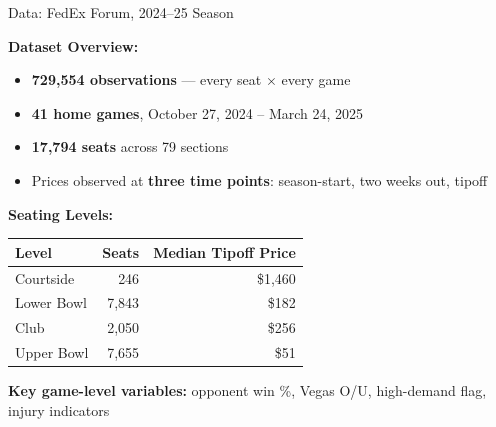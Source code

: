 \documentclass{beamer}
\begin{document}
\begin{frame}{Data: FedEx Forum, 2024--25 Season}

\textbf{Dataset Overview:}
\begin{itemize}
    \item \textbf{729,554 observations} — every seat $\times$ every game
    \item \textbf{41 home games}, October 27, 2024 -- March 24, 2025
    \item \textbf{17,794 seats} across 79 sections
    \item Prices observed at \textbf{three time points}: season-start, two weeks out, tipoff
\end{itemize}

\vspace{0.3cm}
\textbf{Seating Levels:}
\begin{center}
\begin{tabular}{lrr}
\toprule
Level & Seats & Median Tipoff Price \\
\midrule
Courtside & 246 & \$1,460 \\
Lower Bowl & 7,843 & \$182 \\
Club & 2,050 & \$256 \\
Upper Bowl & 7,655 & \$51 \\
\bottomrule
\end{tabular}
\end{center}

\vspace{0.2cm}
\textbf{Key game-level variables:} opponent win \%, Vegas O/U, high-demand flag, injury indicators

\end{frame}
\end{document}
